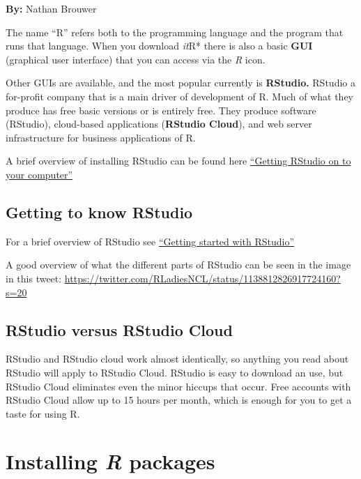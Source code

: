 \documentclass[
]{book}
\begin{document}
\textbf{By:} Nathan Brouwer

The name ``R'' refers both to the programming language and the program that runs that language. When you download \emph{it}R* there is also a basic \textbf{GUI} (graphical user interface) that you can access via the \emph{R} icon.

Other GUIs are available, and the most popular currently is \textbf{RStudio.} RStudio a for-profit company that is a main driver of development of R. Much of what they produce has free basic versions or is entirely free. They produce software (RStudio), cloud-based applications (\textbf{RStudio Cloud}), and web server infrastructure for business applications of R.

A brief overview of installing RStudio can be found here \href{https://brouwern.github.io/BOOK_R_Ecological_Data_Science/getting-rstudio-on-to-your-computer.html}{``Getting RStudio on to your computer''}

\hypertarget{getting-to-know-rstudio}{%
\section{Getting to know RStudio}\label{getting-to-know-rstudio}}

For a brief overview of RStudio see \href{https://brouwern.github.io/BOOK_R_Ecological_Data_Science/getting-started-with-rstudio.html}{``Getting started with RStudio''}

A good overview of what the different parts of RStudio can be seen in the image in this tweet: \url{https://twitter.com/RLadiesNCL/status/1138812826917724160?s=20}

\hypertarget{rstudio-versus-rstudio-cloud}{%
\section{RStudio versus RStudio Cloud}\label{rstudio-versus-rstudio-cloud}}

RStudio and RStudio cloud work almost identically, so anything you read about RStudio will apply to RStudio Cloud. RStudio is easy to download an use, but RStudio Cloud eliminates even the minor hiccups that occur. Free accounts with RStudio Cloud allow up to 15 hours per month, which is enough for you to get a taste for using R.

\hypertarget{installing-r-packages}{%
\chapter{\texorpdfstring{Installing \emph{R} packages}{Installing R packages}}\label{installing-r-packages}}
\end{document}
